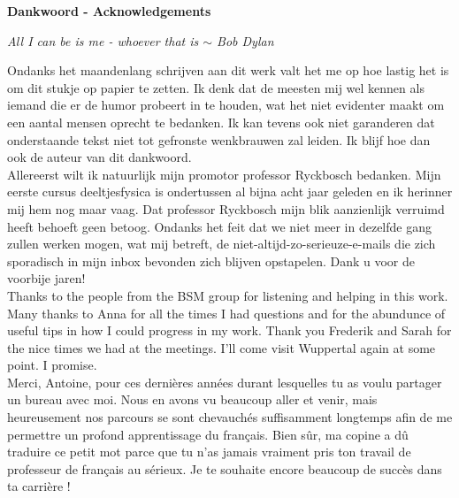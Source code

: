 \clearpage
\thispagestyle{empty}

\begin{huge}
\textbf{Dankwoord - Acknowledgements}\\
\end{huge}
\begin{flushright}
\textit{All I can be is me - whoever that is $\sim$ Bob Dylan
\\}
\end{flushright}

\noindent Ondanks het maandenlang schrijven aan dit werk valt het me op hoe lastig het is om dit stukje op papier te zetten. Ik denk dat de meesten mij wel kennen als iemand die er de humor probeert in te houden, wat het niet evidenter maakt om een aantal mensen oprecht te bedanken. Ik kan tevens ook niet garanderen dat onderstaande tekst niet tot gefronste wenkbrauwen zal leiden. Ik blijf hoe dan ook de auteur van dit dankwoord.\\

\noindent Allereerst wilt ik natuurlijk mijn promotor professor Ryckbosch bedanken. Mijn eerste cursus deeltjesfysica is ondertussen al bijna acht jaar geleden en ik herinner mij hem nog maar vaag. Dat professor Ryckbosch mijn blik aanzienlijk verruimd heeft behoeft geen betoog. Ondanks het feit dat we niet meer in dezelfde gang zullen werken mogen, wat mij betreft, de niet-altijd-zo-serieuze-e-mails die zich sporadisch in mijn inbox bevonden zich blijven opstapelen. Dank u voor de voorbije jaren!\\

\noindent Thanks to the people from the BSM group for listening and helping in this work. Many thanks to Anna for all the times I had questions and for the abundunce of useful tips in how I could progress in my work. Thank you Frederik and Sarah for the nice times we had at the meetings. I'll come visit Wuppertal again at some point. I promise.\\

\noindent Merci, Antoine, pour ces dernières années durant lesquelles tu as voulu partager un bureau avec moi. Nous en avons vu beaucoup aller et venir, mais heureusement nos parcours se sont chevauchés suffisamment longtemps afin de me permettre un profond apprentissage du français. Bien sûr, ma copine a dû traduire ce petit mot parce que tu n'as jamais vraiment pris ton travail de professeur de français au sérieux. Je te souhaite encore beaucoup de succès dans ta carrière !\\

